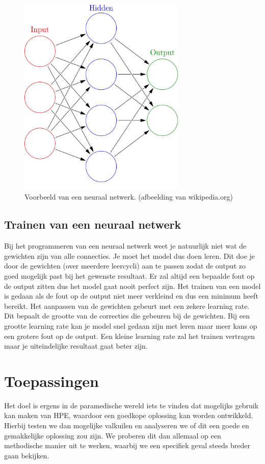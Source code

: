 \documentclass{article}
\begin{document}
\begin{figure}
	\begin{center}
		\includegraphics[width=8cm]{netwerk.png}
	\end{center}
	\caption{Voorbeeld van een neuraal netwerk. (afbeelding van wikipedia.org)}
	\label{netwerk}
\end{figure}

\subsection{Trainen van een neuraal netwerk}
Bij het programmeren van een neuraal netwerk weet je natuurlijk niet wat de gewichten zijn van alle connecties. Je moet het model dus doen leren. Dit doe je door de gewichten (over meerdere leercycli) aan te passen zodat de output zo goed mogelijk past bij het gewenste resultaat. Er zal altijd een bepaalde fout op de output zitten dus het model gaat nooit perfect zijn. Het trainen van een model is gedaan als de fout op de output niet meer verkleind en dus een minimum heeft bereikt. Het aanpassen van de gewichten gebeurt met een zekere learning rate. Dit bepaalt de grootte van de correcties die gebeuren bij de gewichten. Bij een grootte learning rate kan je model snel gedaan zijn met leren maar meer kans op een grotere fout op de output. Een kleine learning rate zal het trainen vertragen maar je uiteindelijke resultaat gaat beter zijn.



\section{Toepassingen}
Het doel is ergens in de paramedische wereld iets te vinden dat mogelijks gebruik kan maken van HPE, waardoor een goedkope oplossing kan worden ontwikkeld. Hierbij testen we dan mogelijke valkuilen en analyseren we of dit een goede en gemakkelijke oplossing zou zijn. We proberen dit dan allemaal op een methodische manier uit te werken, waarbij we een specifiek geval steeds breder gaan bekijken.
\end{document}
